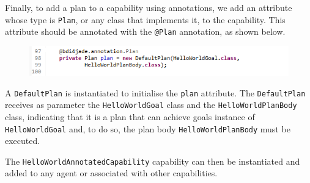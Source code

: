 \documentclass{article}
\begin{document}
Finally, to add a plan to a capability using annotations, we add an attribute whose type is \texttt{Plan}, or any class that implements it, to the capability. This attribute should be annotated with the \texttt{@Plan} annotation, as shown below.

\begin{figure}[!h]
\centering
\includegraphics[width=\linewidth]{objplan}
\label{fig:objplan}
\end{figure}

A \texttt{DefaultPlan} is instantiated to initialise the \texttt{plan} attribute. The \texttt{DefaultPlan}  receives as parameter the \texttt{HelloWorldGoal} class and the \texttt{HelloWorldPlanBody} class, indicating that it is a plan that can achieve goals instance of \texttt{HelloWorldGoal} and, to do so, the plan body \texttt{HelloWorldPlanBody} must be executed.

The \texttt{HelloWorldAnnotatedCapability} capability can then be instantiated and added to any agent or associated with other capabilities.




\end{document}
